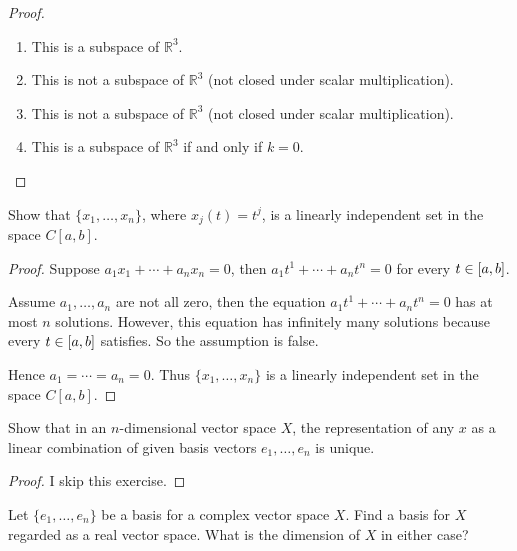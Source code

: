 \begin{proof}
    \begin{enumerate}[label={(\alph*)}]
        \item This is a subspace of $\mathbb{R}^{3}$.
        \item This is not a subspace of $\mathbb{R}^{3}$ (not closed under scalar multiplication).
        \item This is not a subspace of $\mathbb{R}^{3}$ (not closed under scalar multiplication).
        \item This is a subspace of $\mathbb{R}^{3}$ if and only if $k = 0$.
    \end{enumerate}
\end{proof}

\begin{exercise}\label{chapter2:section1:exercise5}
    Show that $\{ x_{1}, \ldots, x_{n} \}$, where $x_{j}(t) = t^{j}$, is a linearly independent set in the space $C[a, b]$.
\end{exercise}

\begin{proof}
    Suppose $a_{1}x_{1} + \cdots + a_{n}x_{n} = 0$, then $a_{1}t^{1} + \cdots + a_{n}t^{n} = 0$ for every $t\in \left[{a, b}\right]$.

    Assume $a_{1}, \ldots, a_{n}$ are not all zero, then the equation $a_{1}t^{1} + \cdots + a_{n}t^{n} = 0$ has at most $n$ solutions. However, this equation has infinitely many solutions because every $t\in\left[{a, b}\right]$ satisfies. So the assumption is false.

    Hence $a_{1} = \cdots = a_{n} = 0$. Thus $\{ x_{1}, \ldots, x_{n} \}$ is a linearly independent set in the space $C[a, b]$.
\end{proof}

\begin{exercise}\label{chapter2:section1:exercise6}
    Show that in an $n$-dimensional vector space $X$, the representation of any $x$ as a linear combination of given basis vectors $e_{1}, \ldots, e_{n}$ is unique.
\end{exercise}

\begin{proof}
    I skip this exercise.
\end{proof}

\begin{exercise}\label{chapter2:section1:exercise7}
    Let $\{ e_{1}, \ldots, e_{n} \}$ be a basis for a complex vector space $X$. Find a basis for $X$ regarded as a real vector space. What is the dimension of $X$ in either case?
\end{exercise}

